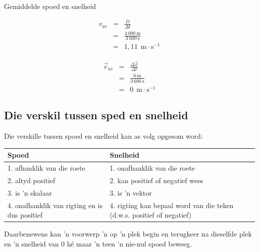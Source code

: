 \begin{wex}{Gemiddelde spoed en snelheid}
{
\begin{eqnarray*}
v_{av}&=&\frac{D}{\Delta t}\\
&=&\frac{4\ 000\ \text{m}}{3\ 600\ \text{s}}\\
&=&1,11\ ~\text{m}\cdot \text{s}^{-1}
\end{eqnarray*}

\begin{eqnarray*}
{\vec{v}_{av}}&=&\frac{\Delta \vec{x}}{\Delta t}\\
&=&\frac{0\ \text{m}}{3\ 600\ \text{s}}\\
&=& 0\ ~\text{m}\cdot \text{s}^{-1}
\end{eqnarray*}}
\end{wex}


\subsection*{Die verskil tussen sped en snelheid}
Die verskille tussen spoed en snelheid kan as volg opgesom word:\par
\begin{center}
\begin{tabular}{|p{5cm}|p{5cm}|}\hline
\textbf{Spoed} & \textbf{Snelheid} \\\hline
1. afhanklik van die roete & 1. onafhanklik van die roete \\\hline
2. altyd positief & 2. kan positief of negatief wees \\\hline
3. is 'n skalaar & 3. is 'n vektor \\\hline
4. onafhanklik van rigting en is dus positief & 4. rigting kan bepaal word van die teken (d.w.s. positief of negatief) \\\hline
\end{tabular}
\end{center}
    \par
Daarbenewens kan 'n voorwerp 'n op 'n plek begin en terugkeer na dieselfde plek en 'n snelheid van 0 h\^e maar 'n teen 'n nie-nul spoed beweeg. \par

